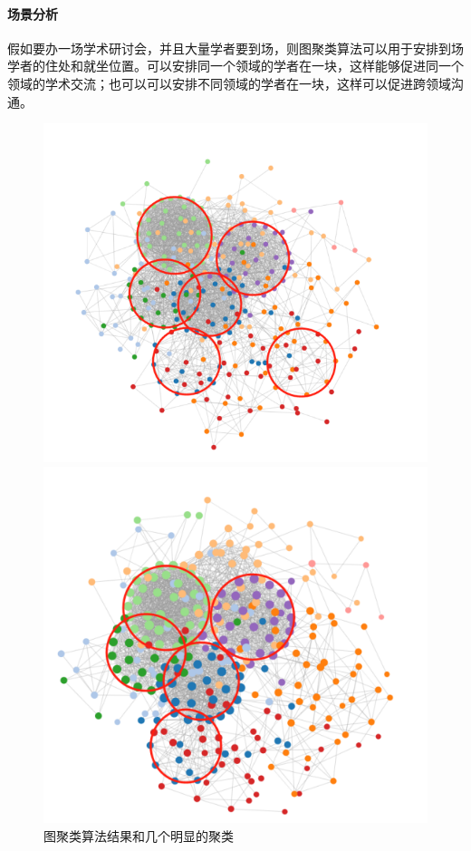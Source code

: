 \documentclass[UTF8, onecolumn, a4paper]{article}
\begin{document}
    \paragraph{场景分析}假如要办一场学术研讨会，并且大量学者要到场，则图聚类算法可以用于安排到场学者的住处和就坐位置。可以安排同一个领域的学者在一块，这样能够促进同一个领域的学术交流；也可以可以安排不同领域的学者在一块，这样可以促进跨领域沟通。
\begin{center}
	\begin{figure}[ht] %
		\centering %
		\begin{minipage}[b]{0.95\linewidth} %
			\begin{minipage}[b]{0.47\linewidth} %
				\centering
				\includegraphics[width=\linewidth]{../pictures/show21}
				\caption{图聚类算法结果和几个明显的聚类}
			\end{minipage}
			\hfill
			\begin{minipage}[b]{0.46\linewidth}
				\centering
				\includegraphics[width=\linewidth]{../pictures/show22}

\end{minipage}
\end{minipage}
\end{figure}
\end{center}
\end{document}
